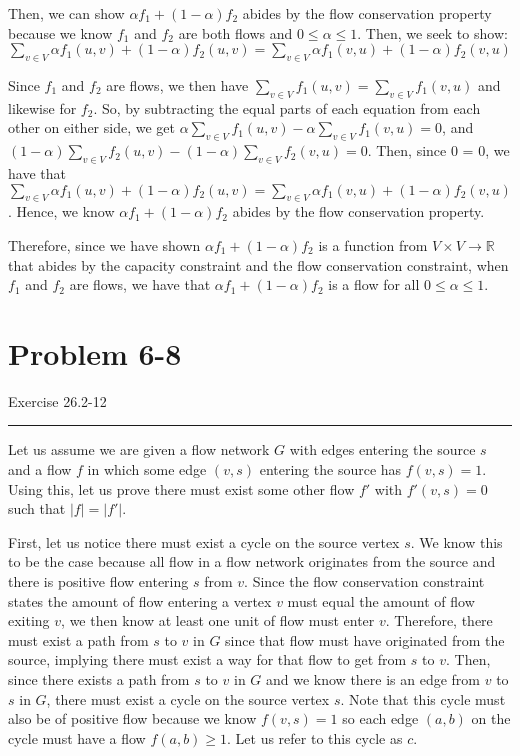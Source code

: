\documentclass[11pt]{article}
\def\separateline{\medskip\hrule\medskip}
\begin{document}
Then, we can show $\alpha f_1 + (1-\alpha) f_2$ abides by the flow conservation property because we know $f_1$ and $f_2$ are both flows and $0 \leq \alpha \leq 1$. Then, we seek to show: $\sum_{v \in V}{\alpha f_1(u,v) + (1 - \alpha) f_2(u,v)} = \sum_{v \in V}{\alpha f_1(v,u) + (1 - \alpha) f_2(v,u)}$

Since $f_1$ and $f_2$ are flows, we then have $\sum_{v \in V}{f_1(u,v)} = \sum_{v \in V}{f_1(v,u)}$ and likewise for $f_2$. So, by subtracting the equal parts of each equation from each other on either side, we get $\alpha \sum_{v \in V}{f_1(u,v)} - \alpha \sum_{v \in V}{f_1(v,u)} = 0$, and $(1-\alpha) \sum_{v \in V}{f_2(u,v)} - (1 - \alpha) \sum_{v \in V}{f_2(v,u)} = 0$. Then, since 0 = 0, we have that $\sum_{v \in V}{\alpha f_1(u,v) + (1 - \alpha) f_2(u,v)} = \sum_{v \in V}{\alpha f_1(v,u) + (1 - \alpha) f_2(v,u)}$. Hence, we know $\alpha f_1 + (1-\alpha) f_2$ abides by the flow conservation property.

Therefore, since we have shown $\alpha f_1 + (1-\alpha) f_2$ is a function from $V \times V \rightarrow \mathbb{R}$ that abides by the capacity constraint and the flow conservation constraint, when $f_1$ and $f_2$ are flows, we have that $\alpha f_1 + (1-\alpha) f_2$ is a flow for all $0 \leq \alpha \leq 1$.


\newpage


\section{Problem 6-8}
Exercise 26.2-12
\separateline

Let us assume we are given a flow network $G$ with edges entering the source $s$ and a flow $f$ in which some edge $(v,s)$ entering the source has $f(v,s) = 1$. Using this, let us prove there must exist some other flow $f'$ with $f'(v,s) = 0$ such that $|f| = |f'|$.

First, let us notice there must exist a cycle on the source vertex $s$. We know this to be the case because all flow in a flow network originates from the source and there is positive flow entering $s$ from $v$. Since the flow conservation constraint states the amount of flow entering a vertex $v$ must equal the amount of flow exiting $v$, we then know at least one unit of flow must enter $v$. Therefore, there must exist a path from $s$ to $v$ in $G$ since that flow must have originated from the source, implying there must exist a way for that flow to get from $s$ to $v$. Then, since there exists a path from $s$ to $v$ in $G$ and we know there is an edge from $v$ to $s$ in $G$, there must exist a cycle on the source vertex $s$. Note that this cycle must also be of positive flow because we know $f(v,s) = 1$ so each edge $(a,b)$ on the cycle must have a flow $f(a,b) \geq 1$. Let us refer to this cycle as $c$.
\end{document}
